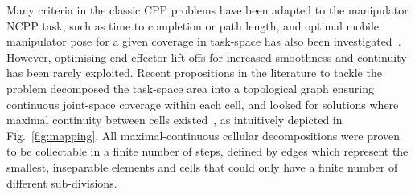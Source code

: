 \documentclass[conference]{IEEEtran}
\begin{document}
Many criteria in the classic CPP problems have been adapted to the manipulator NCPP task, such as time to completion or path length, and optimal mobile manipulator pose for a given coverage in task-space has also been investigated~\cite{paus2017a}. However, optimising  end-effector lift-offs for increased smoothness and continuity has been rarely exploited. %
Recent propositions in the literature to tackle the problem decomposed the task-space area into a %
topological graph ensuring continuous joint-space coverage within each cell, and looked for solutions where maximal continuity between cells existed~\cite{Yang2020Cellular}, as intuitively depicted in Fig.~\ref{fig:mapping}. 
All maximal-continuous cellular decompositions were proven to be collectable in a finite number of steps, defined by edges which represent the smallest, inseparable elements and cells that could only have a finite number of different sub-divisions.  

\end{document}
